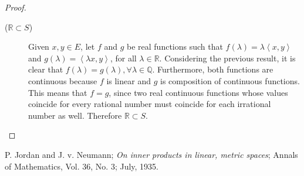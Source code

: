 \documentclass{article}
\newcommand{\Q}{\mathbb{Q}}
\newcommand{\R}{\mathbb{R}}
\newcommand{\ip}[2]{\left\langle #1, #2\right\rangle}
\begin{document}
\begin{proof}
\begin{description}
  \item[(\(\R \subset S\))] Given \(x, y \in E\), let \(f\) and \(g\)
    be real functions such that \(f(\lambda)=\lambda\ip{x}{y}\) and
    \(g(\lambda)=\ip{\lambda x}{y}\), for all \(\lambda \in \R\).
    Considering the previous result, it is clear that
    \(f(\lambda)=g(\lambda), \forall \lambda\in\Q\).  Furthermore,
    both functions are continuous because \(f\) is linear and \(g\) is
    composition of continuous functions.  This means that \(f=g\),
    since two real continuous functions whose values coincide for
    every rational number must coincide for each irrational number as
    well.  Therefore \(\R \subset S\).
  \end{description}
\end{proof}

\begin{thebibliography}{9}
 P. Jordan and J. v. Neumann; \emph{On inner products in
    linear, metric spaces}; Annals of Mathematics, Vol. 36, No. 3;
  July, 1935.
\end{thebibliography}
\end{document}
